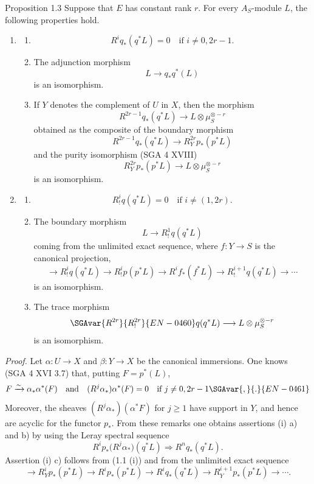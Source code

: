 \begin{statement}{Proposition 1.3}
Suppose that $E$ has constant rank $r$. For every $A_S$-module $L$, the following properties hold.
\begin{enumerate}[label=(\roman*)]
\item
\begin{enumerate}[label=\alph*)]
\item
\[
R^i q_*(q^*L)=0\quad\text{if }i\ne 0,2r-1.
\]
\item The adjunction morphism
\[
L\longrightarrow q_*q^*(L)
\]
is an isomorphism.
\item If $Y$ denotes the complement of $U$ in $X$, then the morphism
\[
R^{2r-1}q_*(q^*L)\longrightarrow L\otimes\mu_S^{\otimes -r}
\]
obtained as the composite of the boundary morphism
\[
R^{2r-1}q_*(q^*L)\longrightarrow R_Y^{2r}p_*(p^*L)
\tag{1}
\]
and the purity isomorphism (SGA 4 XVIII)
\[
R_Y^{2r}p_*(p^*L)\longrightarrow L\otimes\mu_S^{\otimes -r}
\]
is an isomorphism.
\end{enumerate}
\item
\begin{enumerate}[label=\alph*)]
\item
\[
R_!^i q(q^*L)=0\quad\text{if }i\ne (1,2r).
\]
\item The boundary morphism
\[
L\longrightarrow R_!^1 q(q^*L)
\]
coming from the unlimited exact sequence, where $f:Y\to S$ is the canonical projection,
\[
\longrightarrow R_!^i q(q^*L)\longrightarrow R_!^i p(p^*L)
\longrightarrow R^i f_*(f^*L)\longrightarrow R_!^{i+1}q(q^*L)\longrightarrow\cdots
\]
is an isomorphism.
\item The trace morphism
\[
\SGAvar{R^{2r}}{R_!^{2r}}{EN-0460}q(q^*L)\longrightarrow L\otimes\mu_S^{\otimes -r}
\]
is an isomorphism.
\end{enumerate}
\end{enumerate}
\end{statement}

\emph{Proof.} Let $\alpha:U\to X$ and $\beta:Y\to X$ be the canonical immersions. One knows (SGA 4 XVI 3.7) that, putting $F=p^*(L)$,
\[
F\xrightarrow{\sim}\alpha_*\alpha^*(F)
\quad\text{and}\quad
(R^j\alpha_*)\alpha^*(F)=0\quad\text{if }j\ne0,2r-1\SGAvar{,}{.}{EN-0461}
\]
Moreover, the sheaves $(R^j\alpha_*)(\alpha^*F)$ for $j\ge1$ have support in $Y$, and hence are acyclic for the functor $p_*$. From these remarks one obtains assertions (i) a) and b) by using the Leray spectral sequence
\[
R^i p_*\bigl(R^j\alpha_*\bigr)(q^*L)\Longrightarrow R^n q_*(q^*L).
\]
Assertion (i) c) follows from (1.1 (i)) and from the unlimited exact sequence
\[
\longrightarrow R_Y^i p_*(p^*L)\longrightarrow R^i p_*(p^*L)\longrightarrow R^i q_*(q^*L)
\longrightarrow R_Y^{i+1}p_*(p^*L)\longrightarrow\cdots.
\]

